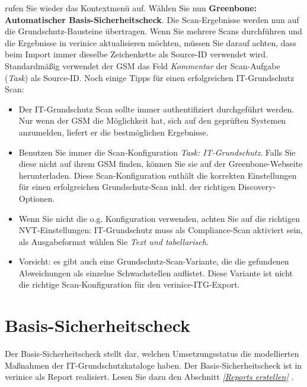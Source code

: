 \documentclass[a4paper,10pt]{book}
\begin{document}
 rufen Sie wieder das Kontextmenü auf. Wählen Sie nun \textbf{Greenbone: Automatischer Basis-Sicherheitscheck}. Die Scan-Ergebnisse werden nun auf die Grundschutz-Bausteine übertragen.
Wenn Sie mehrere Scans durchführen und die Ergebnisse in verinice aktualisieren möchten, müssen Sie darauf achten, dass beim Import immer dieselbe Zeichenkette als Source-ID verwendet wird. Standardmäßig verwendet der GSM das Feld {\em Kommentar} der Scan-Aufgabe ({\em Task}) als Source-ID.
Noch einige Tipps für einen erfolgreichen IT-Grundschutz Scan:
 \begin{itemize}
    \item Der IT-Grundschutz Scan sollte immer authentifiziert durchgeführt werden. Nur wenn der GSM die Möglichkeit hat, sich auf den geprüften Systemen anzumelden, liefert er die bestmöglichen Ergebnisse.
    \item Benutzen Sie immer die Scan-Konfiguration {\em Task: IT-Grundschutz}. Falls Sie diese nicht auf ihrem GSM finden, können Sie sie auf der Greenbone-Webseite herunterladen. Diese Scan-Konfiguration enthält die korrekten Einstellungen für einen erfolgreichen Grundschutz-Scan inkl. der richtigen Discovery-Optionen.
    \item Wenn Sie nicht die o.g. Konfiguration verwenden, achten Sie auf die richtigen NVT-Einstellungen: IT-Grundschutz muss als Compliance-Scan aktiviert sein, als Ausgabeformat wählen Sie {\em Text und tabellarisch}.
    \item Vorsicht: es gibt auch eine Grundschutz-Scan-Variante, die die gefundenen Abweichungen als einzelne Schwachstellen auflistet. Diese Variante ist nicht die richtige Scan-Konfiguration für den verinice-ITG-Export.
 \end{itemize}

\section{Basis-Sicherheitscheck}
Der Basis-Sicherheitscheck stellt dar, welchen Umsetzungsstatus die modellierten Maßnahmen der
IT-Grundschutzkataloge haben. Der Basis-Sicherheitscheck ist in verinice als Report realisiert.
Lesen Sie dazu den Abschnitt {\em \ref{Reports erstellen} }.
\end{document}
